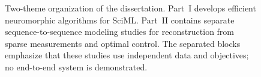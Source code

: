 \begin{figure}[htbp]
  \centering
  
  \caption{Two-theme organization of the dissertation. Part~I develops efficient neuromorphic algorithms for SciML. Part~II contains separate sequence-to-sequence modeling studies for reconstruction from sparse measurements and optimal control. The separated blocks emphasize that these studies use independent data and objectives; no end-to-end system is demonstrated.}
  \label{fig:intro:arc}
\end{figure}
